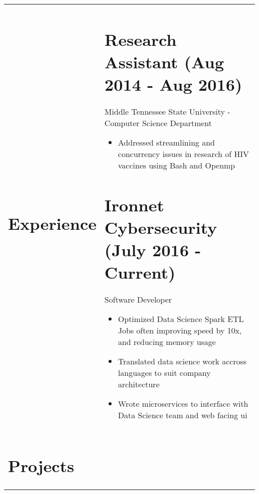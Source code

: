 \documentclass[10pt]{article}
\begin{document}
\begin{tabularx}{\textwidth}{p{3cm} X}
\section*{Experience}
& \section*{Research Assistant (Aug 2014 - Aug 2016)}
Middle Tennessee State University - Computer Science Department
\begin{itemize}
\setlength{\itemsep}{1pt}
\item Addressed streamlining and concurrency issues in research of HIV vaccines using Bash and Openmp
\end{itemize}
\section*{Ironnet Cybersecurity (July 2016 - Current)}
Software Developer
\begin{itemize}
\setlength{\itemsep}{1pt}
\item Optimized Data Science Spark ETL Jobs often improving speed by 10x, and reducing memory usage
\item Translated data science work accross languages to suit company architecture
\item Wrote microservices to interface with Data Science team and web facing ui
\end{itemize}\\
\section*{Projects} &

\end{tabularx}
\end{document}
